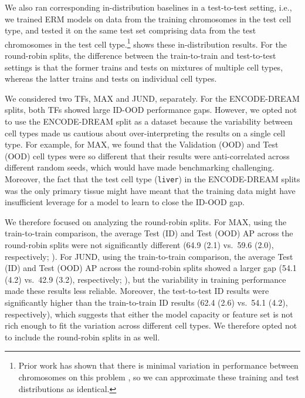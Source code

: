 We also ran corresponding in-distribution baselines in a test-to-test setting, i.e., we trained ERM models on data from the training chromosomes in the test cell type, and tested it on the same test set comprising data from the test chromosomes in the test cell type.\footnote{
Prior work has shown that there is minimal variation in performance between chromosomes on this problem \citep{won2010genome, deepbind15, keilwagen2019accurate}, so we can approximate these training and test distributions as identical.
}
 shows these in-distribution results.
For the round-robin splits, the difference between the train-to-train and test-to-test settings is that the former trains and tests on mixtures of multiple cell types, whereas the latter trains and tests on individual cell types.

We considered two TFs, MAX and JUND, separately.
For the ENCODE-DREAM splits, both TFs showed large ID-OOD performance gaps.
However, we opted not to use the ENCODE-DREAM split as a \Wilds dataset
because the variability between cell types made us cautious about over-interpreting the results on a single cell type. For example, for MAX, we found that the Validation (OOD) and Test (OOD) cell types were so different that their results were anti-correlated across different random seeds, which would have made benchmarking challenging.
Moreover, the fact that the test cell type (\texttt{liver}) in the ENCODE-DREAM splits was the only primary tissue might have meant that the training data might have insufficient leverage for a model to learn to close the ID-OOD gap.

We therefore focused on analyzing the round-robin splits.
For MAX, using the train-to-train comparison, the average Test (ID) and Test (OOD) AP across the round-robin splits were not significantly different (64.9 (2.1) vs.~59.6 (2.0), respectively; ).
For JUND, using the train-to-train comparison, the average Test (ID) and Test (OOD) AP across the round-robin splits showed a larger gap (54.1 (4.2) vs.~42.9 (3.2), respectively; ), but the variability in training performance made these results less reliable. Moreover, the test-to-test ID results were significantly higher than the train-to-train ID results (62.4 (2.6) vs.~54.1 (4.2), respectively), which suggests that either the model capacity or feature set is not rich enough to fit the variation across different cell types.
We therefore opted not to include the round-robin splits in \Wilds as well.

